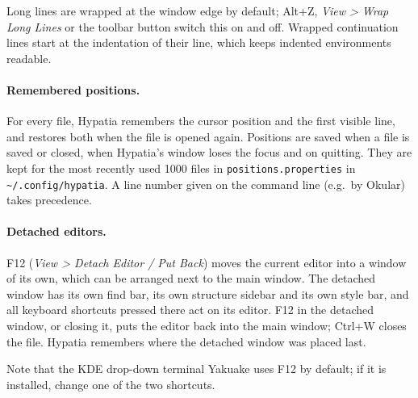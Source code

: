 \documentclass[11pt]{article}
\newcommand{\key}[1]{\textsf{#1}}
\newcommand{\menu}[1]{\textsf{\textit{#1}}}
\newcommand{\file}[1]{\texttt{#1}}
\newcommand{\cfgdir}{\texttt{\textasciitilde/.config/hypatia}}
\begin{document}
    Long lines are wrapped at the window edge by default; \key{Alt+Z}, \menu{View > Wrap Long Lines} or the toolbar button switch this on and off. Wrapped continuation lines start at the indentation of their line, which keeps indented environments readable.

    \paragraph{Remembered positions.}     For every file, Hypatia remembers the cursor position and the first visible line, and restores both when the file is opened again. Positions are saved when a file is saved or closed, when Hypatia's window loses the focus and on quitting. They are kept for the most recently used 1000 files in \file{positions.properties} in \cfgdir. A line number given on the command line (e.g.\ by Okular) takes precedence.

    \paragraph{Detached editors.}     \key{F12} (\menu{View > Detach Editor / Put Back}) moves the current editor into a window of its own, which can be arranged next to the main window. The detached window has its own find bar, its own structure sidebar and its own style bar, and all keyboard shortcuts pressed there act on its editor. \key{F12} in the detached window, or closing it, puts the editor back into the main window; \key{Ctrl+W} closes the file. Hypatia remembers where the detached window was placed last.

    Note that the KDE drop-down terminal Yakuake uses \key{F12} by default; if it is installed, change one of the two shortcuts.
\end{document}
